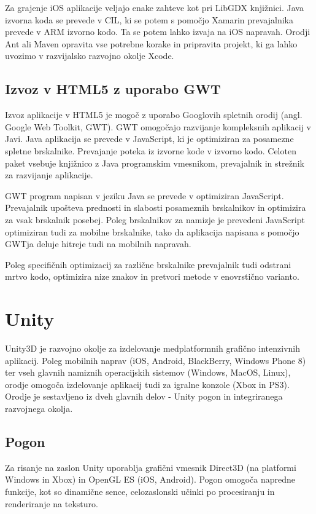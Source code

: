 Za grajenje iOS aplikacije veljajo enake zahteve kot pri LibGDX knjižnici. Java izvorna koda se prevede v CIL, ki se potem s pomočjo Xamarin prevajalnika prevede v ARM izvorno kodo. Ta se potem lahko izvaja na iOS napravah. Orodji Ant ali Maven opravita vse potrebne korake in pripravita projekt, ki ga lahko uvozimo v razvijalsko razvojno okolje Xcode.

\subsection{Izvoz v HTML5 z uporabo GWT}

Izvoz aplikacije v HTML5 je mogoč z uporabo Googlovih spletnih orodij (angl. Google Web Toolkit, GWT). GWT omogočajo razvijanje kompleksnih aplikacij v Javi. Java aplikacija se prevede v JavaScript, ki je optimiziran za posamezne spletne brskalnike. Prevajanje poteka iz izvorne kode v izvorno kodo. Celoten paket vsebuje knjižnico z Java programskim vmesnikom, prevajalnik in strežnik za razvijanje aplikacije.

GWT program napisan v jeziku Java se prevede v optimiziran JavaScript. Prevajalnik upošteva prednosti in slabosti posameznih brskalnikov in optimizira za vsak brskalnik posebej. Poleg brskalnikov za namizje je prevedeni JavaScript optimiziran tudi za mobilne brskalnike, tako da aplikacija napisana s pomočjo GWTja deluje hitreje tudi na mobilnih napravah.

Poleg specifičnih optimizacij za različne brskalnike prevajalnik tudi odstrani mrtvo kodo, optimizira nize znakov in pretvori metode v enovrstično varianto.

\section{Unity}
\label{sec:unity}

Unity3D \cite{unity} je razvojno okolje za izdelovanje medplatformnih grafično intenzivnih aplikacij. Poleg mobilnih naprav (iOS, Android, BlackBerry, Windows Phone 8) ter vseh glavnih namiznih operacijskih sistemov (Windows, MacOS, Linux), orodje omogoča izdelovanje aplikacij tudi za igralne konzole (Xbox in PS3). Orodje je sestavljeno iz dveh glavnih delov - Unity pogon in integriranega razvojnega okolja.

\subsection{Pogon}

Za risanje na zaslon Unity uporablja grafični vmesnik Direct3D (na platformi Windows in Xbox) in OpenGL ES (iOS, Android). Pogon omogoča napredne funkcije, kot so dinamične sence, celozaslonski učinki po procesiranju in renderiranje na teksturo. 

